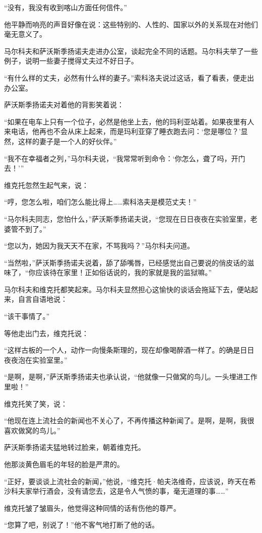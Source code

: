 “没有，我没有收到喀山方面任何信件。”

他平静而响亮的声音好像在说：这些特别的、人性的、国家以外的关系现在对他们毫无意义了。

马尔科夫和萨沃斯季扬诺夫走进办公室，谈起完全不同的话题。马尔科夫举了一些例子，说明一些妻子搅得丈夫过不好日子。

“有什么样的丈夫，必然有什么样的妻子。”索科洛夫说过这话，看了看表，便走出办公室。

萨沃斯季扬诺夫对着他的背影笑着说：

“如果在电车上只有一个位子，必然是他坐上去，他的玛利亚站着。如果夜里有人来电话，他再也不会从床上起来，而是玛利亚穿了睡衣跑去问：‘您是哪位？’显然，这样的妻子是一个人的好伙伴。”

“我不在幸福者之列，”马尔科夫说，“我常常听到命令：‘你怎么，聋了吗，开门去！’”

维克托忽然生起气来，说：

“哼，您怎么啦，咱们怎么能比得上……索科洛夫是模范丈夫！”

“马尔科夫同志，您怕什么，”萨沃斯季扬诺夫说，“您现在日日夜夜在实验室里，老婆管不到了。”

“您以为，她因为我天天不在家，不骂我吗？”马尔科夫问道。

“当然啦，”萨沃斯季扬诺夫说着，舔了舔嘴唇，已经感觉出自己要说的俏皮话的滋味了，“你应该待在家里！正如俗话说的，我的家就是我的监狱嘛。”

马尔科夫和维克托都笑起来。马尔科夫显然担心这愉快的谈话会拖延下去，便站起来，自言自语地说：

“该干事情了。”

等他走出门去，维克托说：

“这样古板的一个人，动作一向慢条斯理的，现在却像喝醉酒一样了。的确是日日夜夜泡在实验室里。”

“是啊，是啊，”萨沃斯季扬诺夫也承认说，“他就像一只做窝的鸟儿。一头埋进工作里啦！”

维克托笑了笑，说：

“他现在连上流社会的新闻也不关心了，不再传播这种新闻了。是啊，是啊，我很喜欢做窝的鸟儿。”

萨沃斯季扬诺夫猛地转过脸来，朝着维克托。

他那淡黄色眉毛的年轻的脸是严肃的。

“正好，要谈谈上流社会的新闻，”他说，“维克托·帕夫洛维奇，应该说，昨天在希沙科夫家举行酒会，没有请您去，这是令人气愤的事，毫无道理的事……”

维克托皱了皱眉头，他觉得这种同情的话有伤他的尊严。

“您算了吧，别说了！”他不客气地打断了他的话。

